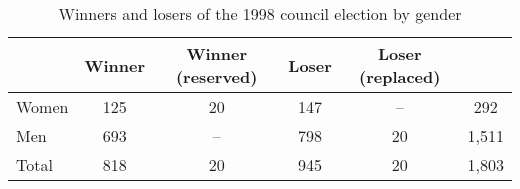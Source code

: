 \begin{table}[]

	\caption{Winners and losers of the 1998 council election by gender}
	\label{tab:1998-winner-loser}

	\centering
	\begin{tabular}{lccccc}
		\toprule
		      & Winner & Winner (reserved) & Loser & Loser (replaced) &       \\ \midrule
		Women & 125    & 20                & 147   & --               & 292   \\
		Men   & 693    & --                & 798   & 20               & 1,511 \\ \midrule
		Total & 818    & 20                & 945   & 20               & 1,803 \\ \bottomrule
	\end{tabular}

\end{table}